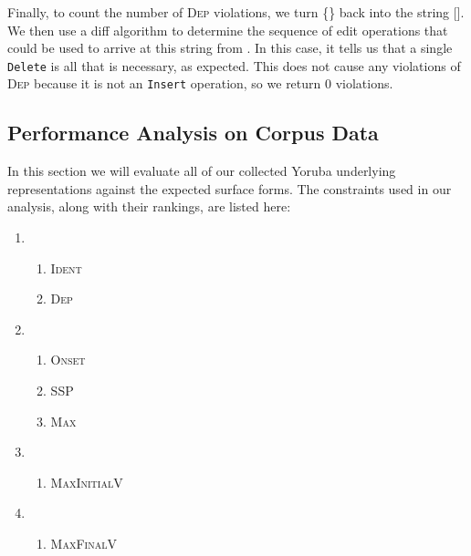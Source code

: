 \documentclass[12pt]{article}
\newcommand{\ident}{\textsc{Ident}}
\newcommand{\maxvplus}{\textsc{MaxFinalV}}
\newcommand{\maxplusv}{\textsc{MaxInitialV}}
\newcommand{\maxc}{\textsc{Max}}
\newcommand{\ssp}{\textsc{SSP}}
\newcommand{\dep}{\textsc{Dep}}
\newcommand{\onset}{\textsc{Onset}}
\begin{document}
Finally, to count the number of \dep{} violations, we turn
\{\} back into the string
[]. We then use a diff algorithm to determine the
sequence of edit operations that could be used to arrive at this string from
. In this case, it tells us that a single
\texttt{Delete} is all that is necessary, as expected. This does not cause any
violations of \dep{} because it is not an \texttt{Insert} operation, so we
return 0 violations.

\subsection{Performance Analysis on Corpus Data}

In this section we will evaluate all of our collected Yoruba underlying
representations against the expected surface forms. The constraints used in our
analysis, along with their rankings, are listed here:

\begin{enumerate}
    \item
        \begin{enumerate}
            \item \ident{}
            \item \dep{}
        \end{enumerate}
    \item
        \begin{enumerate}
            \item \onset{}
            \item \ssp{}
            \item \maxc{}
        \end{enumerate}
    \item
        \begin{enumerate}
            \item \maxplusv{}
        \end{enumerate}
    \item
        \begin{enumerate}
            \item \maxvplus{}
        \end{enumerate}
\end{enumerate}
\end{document}
